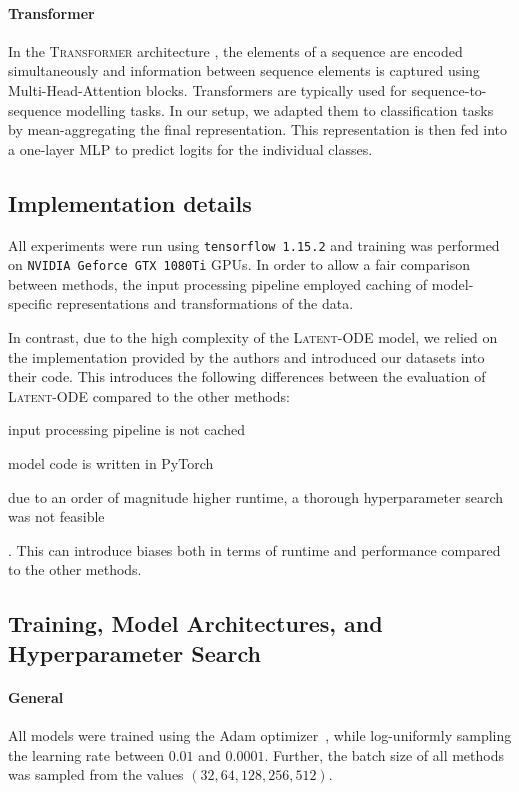 \documentclass{article}
\newcommand{\method}[1]{\textsc{#1}}
\begin{document}
\paragraph{Transformer}
In the \method{Transformer} architecture \citep{vaswani2017attention},
the elements of a sequence are encoded simultaneously and information
between sequence elements is captured using Multi-Head-Attention blocks.
Transformers are typically used for sequence-to-sequence modelling
tasks. In our setup, we adapted them to classification tasks by
mean-aggregating the final representation.  This representation is then
fed into a one-layer MLP to predict logits for the individual classes.

\subsection{Implementation details}\label{appx:imp-details}

All experiments were run using \texttt{tensorflow 1.15.2} and training was
performed on \texttt{NVIDIA Geforce GTX 1080Ti} GPUs. In order to allow a fair
comparison between methods, the input processing pipeline employed
caching of model-specific representations and transformations of the data.

In contrast, due to the high complexity of the \method{Latent-ODE} model, we relied on the implementation provided by the authors and introduced our datasets into their code. This introduces the following differences between the evaluation of \method{Latent-ODE} compared to the other methods: \begin{inparaenum}
\item input processing pipeline is not cached
\item model code is written in PyTorch
\item due to an order of magnitude higher runtime, a thorough hyperparameter search was not feasible
\end{inparaenum}. This can introduce biases both in terms of runtime and
performance compared to the other methods.

\subsection{Training, Model Architectures, and Hyperparameter Search}
\label{appx:hyperparameter-search}

\paragraph{General}
All models were trained using the Adam optimizer~\citep{kingma2014adam},
while log-uniformly sampling the learning rate between $0.01$ and
$0.0001$. Further, the batch size of all methods was sampled from the
values $(32, 64, 128, 256, 512)$.
\end{document}
